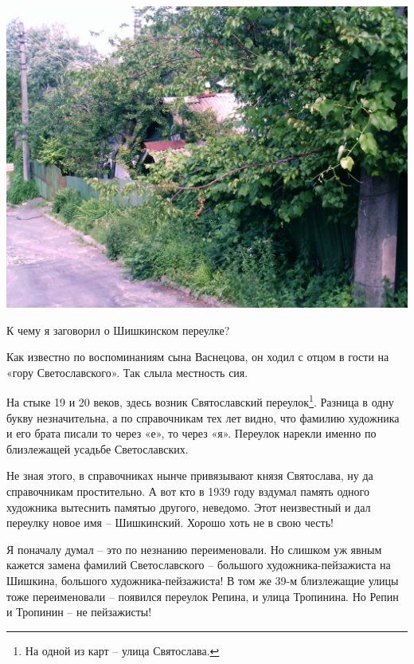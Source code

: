\begin{center}
\includegraphics[width=\linewidth]{chast-kirvys/svetosl/shishk-imag0041.jpg}
\end{center}

\vspace*{\fill}
\newpage

К чему я заговорил о Шишкинском переулке? 


Как известно по воспоминаниям сына Васнецова, он ходил с отцом в гости на «гору Светославского». Так слыла местность сия.

На стыке 19 и 20 веков, здесь возник Святославский переулок\footnote{На одной из карт – улица Святослава.}. Разница в одну букву незначительна, а по справочникам тех лет видно, что фамилию художника и его брата писали то через «е», то через «я». Переулок нарекли именно по близлежащей усадьбе Светославских. 

Не зная этого, в справочниках нынче привязывают князя Святослава, ну да справочникам простительно. А вот кто в 1939 году вздумал память одного художника вытеснить памятью другого, неведомо. Этот неизвестный и дал переулку новое имя – Шишкинский. Хорошо хоть не в свою честь!

Я поначалу думал – это по незнанию переименовали. Но слишком уж явным кажется замена фамилий Светославского – большого художника-пейзажиста на Шишкина, большого художника-пейзажиста! В том же 39-м близлежащие улицы тоже переименовали – появился переулок Репина, и улица Тропинина. Но Репин и Тропинин – не пейзажисты! 


